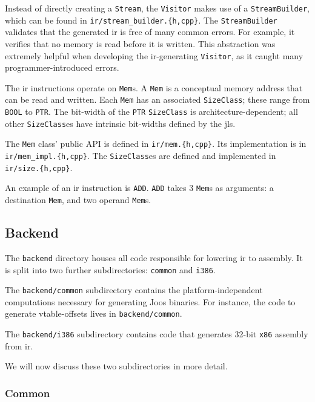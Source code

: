 \documentclass[12pt, titlepage]{article}
\newcommand{\z}[1]{\texttt{#1}}
\begin{document}
Instead of directly creating a \z{Stream}, the \z{Visitor} makes use of a
\z{StreamBuilder}, which can be found in \z{ir/stream\_builder.\{h,cpp\}}. The
\z{StreamBuilder} validates that the generated \ac{ir} is free of many common
errors. For example, it verifies that no memory is read before it is written.
This abstraction was extremely helpful when developing the \ac{ir}-generating
\z{Visitor}, as it caught many programmer-introduced errors.

The \ac{ir} instructions operate on \z{Mem}s. A \z{Mem} is a conceptual memory
address that can be read and written. Each \z{Mem} has an associated
\z{SizeClass}; these range from \z{BOOL} to \z{PTR}. The bit-width of the
\z{PTR} \z{SizeClass} is architecture-dependent; all other \z{SizeClass}es have
intrinsic bit-widths defined by the \ac{jls}.

The \z{Mem} class' public API is defined in \z{ir/mem.\{h,cpp\}}. Its
implementation is in \z{ir/mem\_impl.\{h,cpp\}}. The \z{SizeClass}es are
defined and implemented in \z{ir/size.\{h,cpp\}}.

An example of an \ac{ir} instruction is \z{ADD}. \z{ADD} takes 3 \z{Mem}s as
arguments: a destination \z{Mem}, and two operand \z{Mem}s.

\subsection{Backend}\label{subsec:backend}

The \z{backend} directory houses all code responsible for lowering \ac{ir} to
assembly. It is split into two further subdirectories: \z{common} and \z{i386}.

The \z{backend/common} subdirectory contains the platform-independent
computations necessary for generating Joos binaries. For instance, the code to
generate vtable-offsets lives in \z{backend/common}.

The \z{backend/i386} subdirectory contains code that generates 32-bit \z{x86}
assembly from \ac{ir}.

We will now discuss these two subdirectories in more detail.

\subsubsection{Common}\label{subsubsec:common}
\end{document}
